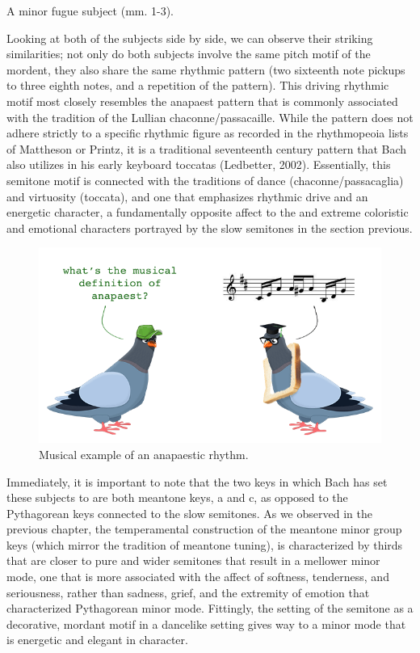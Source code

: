 \begin{Example}[H]
\vspace{1.5em}
    \centering
    \caption{ A minor fugue subject (mm. 1-3). }
\end{Example}    
    Looking at both of the subjects side by side, we can observe their
striking similarities; not only do both subjects involve the same pitch
motif of the mordent, they also share the same rhythmic pattern (two
sixteenth note pickups to three eighth notes, and a repetition of the
pattern). This driving rhythmic motif most closely resembles the
anapaest pattern that is commonly associated with the tradition of the
Lullian chaconne/passacaille. While the pattern does not adhere strictly
to a specific rhythmic figure as recorded in the rhythmopeoia lists of
Mattheson or Printz, it is a traditional seventeenth century pattern
that Bach also utilizes in his early keyboard toccatas (Ledbetter,
2002). Essentially, this semitone motif is connected with the traditions
of dance (chaconne/passacaglia) and virtuosity (toccata), and one that
emphasizes rhythmic drive and an energetic character, a fundamentally
opposite affect to the and extreme coloristic and emotional characters
portrayed by the slow semitones in the section previous.
\begin{figure}[H]
\begin{center}
    \includegraphics{anapest4.png}
\end{center}
\caption{Musical example of an anapaestic rhythm.}
\end{figure}    Immediately, it is important to note that the two keys in which Bach has
set these subjects to are both meantone keys, a and c, as opposed to the
Pythagorean keys connected to the slow semitones. As we observed in the
previous chapter, the temperamental construction of the meantone minor
group keys (which mirror the tradition of meantone tuning), is
characterized by thirds that are closer to pure and wider semitones that
result in a mellower minor mode, one that is more associated with the
affect of softness, tenderness, and seriousness, rather than sadness,
grief, and the extremity of emotion that characterized Pythagorean minor
mode. Fittingly, the setting of the semitone as a decorative, mordant
motif in a dancelike setting gives way to a minor mode that is energetic
and elegant in character.

